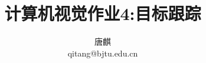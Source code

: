 \documentclass[10pt,journal,compsoc]{IEEEtran}
\begin{document}
\begin{sloppypar}

\title{计算机视觉作业­4:目标跟踪}

\author{唐麒\\qitang@bjtu.edu.cn}




\maketitle






\ifCLASSOPTIONcaptionsoff
  \newpage
\fi



%
%

\end{sloppypar}
\end{document}
